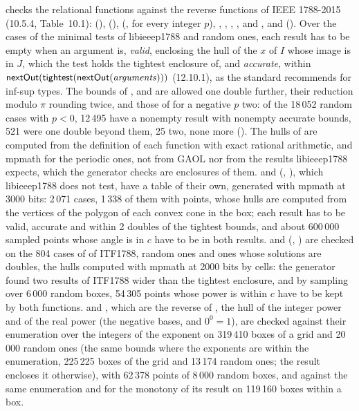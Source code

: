 \medskip
{} checks the relational functions against the reverse functions
of IEEE 1788-2015 (10.5.4, Table~10.1):  (),
 (),  (,
for every integer $p$),\newinvfive{} , ,
, , and , \code{\%} and
\code{\%=} (). Over the cases of the minimal tests of
libieeep1788 and random ones, each result has to be empty when an argument
is, \emph{valid}, enclosing the hull of the $x$ of $I$ whose image is in
$J$, which the test holds the tightest enclosure of, and \emph{accurate},
within $\mbox{\textsf{nextOut}}(\mbox{\textsf{tightest}}(\mbox{\textsf{nextOut}}(\mathit{arguments})))$
(12.10.1), as the standard recommends for inf-sup types. The bounds of
,  and  are allowed one
double further, their reduction modulo $\pi$ rounding twice, and those of
 for a negative $p$ two: of the 18\,052 random cases
with $p<0$, 12\,495 have a nonempty result with nonempty accurate bounds,
521 were one double beyond them, 25 two, none more
().
The hulls of  are computed from the definition of
each function with exact rational arithmetic, and mpmath for the periodic
ones, not from GAOL nor from the results libieeep1788 expects, which the
generator checks are enclosures of them.  and
 (, ),\newinvfive{}
which libieeep1788 does not test, have a table of their own, generated with
mpmath at 3000 bits: 2\,071 cases, 1\,338 of them with points, whose hulls
are computed from the vertices of the polygon of each convex cone in the
box; each result has to be valid, accurate and within 2 doubles of the
tightest bounds, and about 600\,000 sampled points whose angle is in $c$
have to be in both results.  and 
(, )\newinvfive{} are checked on the 804 cases
of  of ITF1788, random ones and ones whose solutions are
doubles, the hulls computed with mpmath at 2000 bits by cells: the generator
found two results of ITF1788 wider than the tightest enclosure, and by
sampling over 6\,000 random boxes, 54\,305 points whose power is within $c$
have to be kept by both functions.  and ,
which are the reverse of , the hull of the integer power and of
the real power (the negative bases, and $0^0=1$), are checked
against their enumeration over the integers of the exponent on 319\,410 boxes
of a grid and 20\,000 random ones (the same bounds where the exponents are
within the enumeration, 225\,225 boxes of the grid and 13\,174 random ones; the
result encloses it otherwise), with 62\,378 points of 8\,000 random boxes,
and  against the same enumeration and for the monotony of its
result on 119\,160 boxes within a box.

